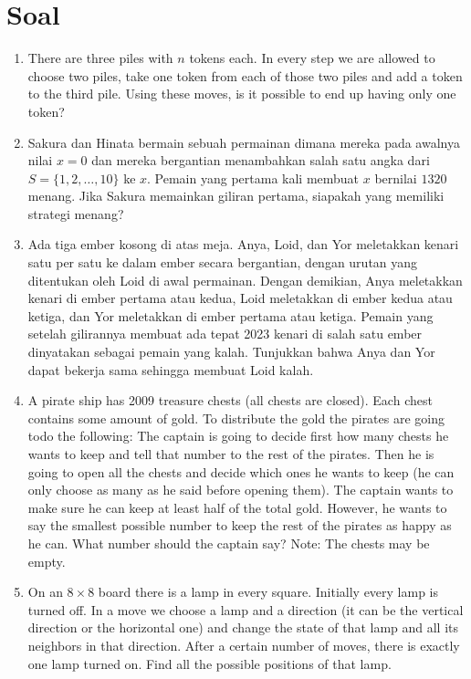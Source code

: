 \documentclass[11pt]{scrartcl}
\begin{document}
\section{Soal}
\begin{enumerate}
    \item There are three piles with $n$ tokens each. In every step we are allowed to choose two piles, take one token from each of those two piles and add a token to the third pile. Using these moves, is it possible to end up having only one token?
    
    \item Sakura dan Hinata bermain sebuah permainan dimana mereka pada awalnya nilai $x=0$ dan mereka bergantian menambahkan salah satu angka dari $S=\{1,2,\dots,10\}$ ke $x$. Pemain yang pertama kali membuat $x$ bernilai $1320$ menang. Jika Sakura memainkan giliran pertama, siapakah yang memiliki strategi menang?
    
    \item Ada tiga ember kosong di atas meja. Anya, Loid, dan Yor meletakkan kenari satu per satu ke dalam ember secara bergantian, dengan urutan yang ditentukan oleh Loid di awal permainan. Dengan demikian, Anya meletakkan kenari di ember pertama atau kedua, Loid meletakkan di ember kedua atau ketiga, dan Yor meletakkan di ember pertama atau ketiga. Pemain yang setelah gilirannya membuat ada tepat 2023 kenari di salah satu ember dinyatakan sebagai pemain yang kalah. Tunjukkan bahwa Anya dan Yor dapat bekerja sama sehingga membuat Loid kalah.
    
    \item A pirate ship has 2009 treasure chests (all chests are closed). Each chest contains some amount of gold. To distribute the gold the pirates are going todo the following: The captain is going to decide first how many chests he wants to keep and tell that number to the rest of the pirates. Then he is going to open all the chests and decide which ones he wants to keep (he can only choose as many as he said before opening them). The captain wants to make sure he can keep at least half of the total gold. However, he wants to say the smallest possible number to keep the rest of the pirates as happy as he can. What number should the captain say?
    Note: The chests may be empty.

    \item On an $8 \times 8$ board there is a lamp in every square. Initially every lamp is turned off. In a move we choose a lamp and a direction (it can be the vertical direction or the horizontal one) and change the state of that lamp and all its neighbors in that direction. After a certain number of moves, there is exactly one lamp turned on. Find all the possible positions of that lamp. %
\end{enumerate}
\end{document}
